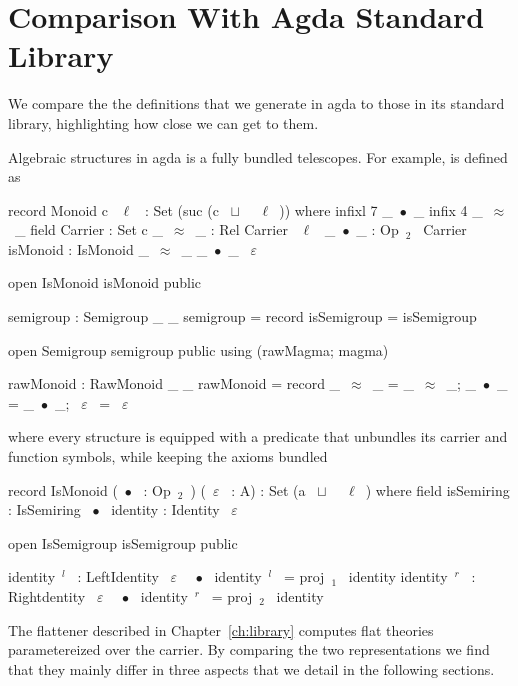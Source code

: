 \section{Comparison With Agda Standard Library}
\label{sec:compasion_agda_stdlib}
We compare the the definitions that we generate in agda to those in its standard library, highlighting how close we can get to them. 

Algebraic structures in agda is a fully bundled telescopes. For example,  is defined as
\begin{agdacode}
record Monoid c ~$\ell$~ : Set (suc (c ~$\sqcup$~ ~$\ell$~)) where 
  infixl 7 _~$\bullet$~_
  infix 4 _~$\approx$~_
  field 
   Carrier : Set c 
   _~$\approx$~_ : Rel Carrier ~$\ell$~ 
   _~$\bullet$~_ : Op~$_2$~ Carrier 
   isMonoid : IsMonoid _~$\approx$~_ _~$\bullet$~_ ~$\varepsilon$~ 
   
   open IsMonoid isMonoid public
   
   semigroup : Semigroup _ _
   semigroup = record { isSemigroup = isSemigroup }
   
   open Semigroup semigroup public using (rawMagma; magma)
   
   rawMonoid : RawMonoid _ _
   rawMonoid = record { _~$\approx$~_ = _~$\approx$~_; _~$\bullet$~_ = _~$\bullet$~_; ~$\varepsilon$~ = ~$\varepsilon$~}
\end{agdacode}
where every structure is equipped with a predicate that unbundles its carrier and function symbols, while keeping the axioms bundled 
\begin{agdacode}
record IsMonoid (~$\bullet$~ : Op~$_2$~) (~$\varepsilon$~ : A) : Set (a ~$\sqcup$~ ~$\ell$~) where 
  field 
   isSemiring : IsSemiring ~$\bullet$~ 
   identity : Identity ~$\varepsilon$~
     
  open IsSemigroup isSemigroup public
     
  identity~$^l$~ : LeftIdentity ~$\varepsilon$~ ~$\bullet$~ 
  identity~$^l$~ = proj~$_1$~ identity  
  identity~$^r$~ : Rightdentity ~$\varepsilon$~ ~$\bullet$~ 
  identity~$^r$~ = proj~$_2$~ identity           
\end{agdacode}
The flattener described in Chapter~\ref{ch:library} computes flat theories parametereized over the carrier. By comparing the two representations we find that they mainly differ in three aspects that we detail in the following sections. 
